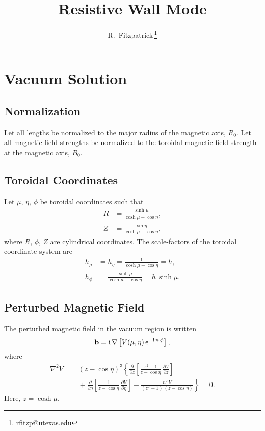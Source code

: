 \documentclass[12pt,prb,aps,notitlepage]{revtex4-1}
\begin{document}
\title{Resistive Wall Mode}
\author{R.~Fitzpatrick\,\footnote{rfitzp@utexas.edu}}
\begin{abstract}
\end{abstract}
\maketitle


\section{Vacuum Solution}

\subsection{Normalization}
Let all lengths be normalized to the major radius of the magnetic axis, $R_0$. Let all
magnetic field-strengths be normalized to the toroidal magnetic field-strength at the magnetic axis, $B_0$.

\subsection{Toroidal Coordinates}
Let $\mu$, $\eta$, $\phi$ be toroidal coordinates such that
\begin{align}
R &= \frac{\sinh\mu}{\cosh\mu-\cos\eta},\\[0.5ex]
Z&=\frac{\sin\eta}{\cosh\mu-\cos\eta},
\end{align}
where $R$, $\phi$, $Z$ are cylindrical coordinates. 
The scale-factors of the toroidal coordinate system are
\begin{align}
h_\mu&=h_\eta= \frac{1}{\cosh\mu-\cos\eta}=h,\\[0.5ex]
h_\phi &= \frac{\sinh\mu}{\cosh\mu-\cos\eta} = h\,\sinh\mu.
\end{align}

\subsection{Perturbed Magnetic Field}
The perturbed magnetic field in the vacuum region is written
\begin{equation}
{\bf b} = {\rm i}\,\nabla \left[V(\mu,\eta)\,{\rm e}^{-{\rm i}\,n\,\phi}\right],
\end{equation}
where
\begin{align}
\nabla^2 V &= (z-\cos\eta)^3\left\{\frac{\partial}{\partial z}\!\left[\frac{z^2-1}{z-\cos\eta}\,\frac{\partial V}{\partial z}\right]\right.\nonumber\\[0.5ex]
&\left.\phantom{=}+\frac{\partial}{\partial \eta}\!\left[\frac{1}{z-\cos\eta}\,\frac{\partial V}{\partial\eta}\right]
-\frac{n^2\,V}{(z^2-1)\,(z-\cos\eta)}\right\}=0.
\end{align}
Here, $z=\cosh\mu$. 
\end{document}
